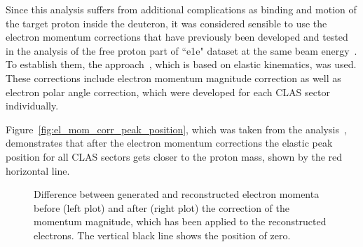 Since this analysis suffers from additional complications as binding and motion of the target proton inside the deuteron, it was considered sensible to use the electron momentum corrections that have previously been developed and tested in the analysis of the free proton part of ``e1e" dataset at the same beam energy~\cite{Fed_an_note:2017}. To establish them, the approach~\cite{KPark:momcorr}, which is based on elastic kinematics, was used. These corrections include electron momentum magnitude correction as well as electron polar angle correction, which were developed for each CLAS sector individually.  



Figure~\ref{fig:el_mom_corr_peak_position}, which was taken from the analysis~\cite{Fed_an_note:2017}, demonstrates that after the electron momentum corrections the elastic peak position for all CLAS sectors gets closer to the proton mass, shown by the red horizontal line.

\begin{figure}[htp]
\begin{center}
\caption{\small Difference between generated and reconstructed electron momenta before (left plot) and after (right plot) the correction of the momentum magnitude, which has been applied to the reconstructed electrons. The vertical black line shows the position of zero. \label{fig:el_mom_corr_sim}} 
\end{center}
\end{figure}

